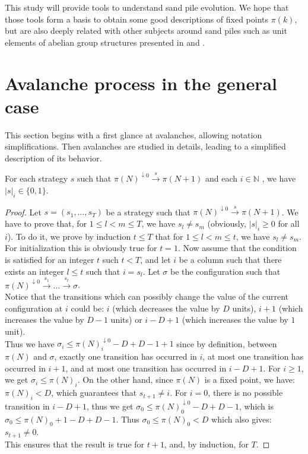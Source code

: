 \documentclass[11pt,a4paper]{llncs}
\newcommand{\N}{\mathbb{N}}
\begin{document}
This study will provide tools to understand sand pile evolution. We hope that those tools form a basis to obtain  some good descriptions of fixed points $\pi(k)$, but are also deeply related with other subjects around sand piles such as unit elements of abelian group structures presented 
in \cite{creutz96} and \cite{dhar90}.

\section{Avalanche process in the general case}\label{section:avalanche}

This section begins with a first glance at avalanches, allowing notation simplifications. Then avalanches are studied in details, leading to a simplified description of its behavior.

\begin{proposition}\label{lemma:01}
  For each strategy $s$  such that  $\pi(N)^{\downarrow 0}  \overset{s} {\rightarrow}\pi(N+1)$ and  each $i \in \N$ , we have  $|s|_i \in \{0,1\}$. 
\end{proposition}

\begin{proof}
  Let $s=(s_1,\dots,s_T)$ be a strategy such that  $\pi(N)^{\downarrow 0}  \overset{s} {\rightarrow}\pi(N+1)$. We have to  prove  that, for  
  $1 \leq l < m \leq T$, we have $s_l \not = s_m$ (obviously, $|s|_i \geq 0$ for all $i$). To do it,  we prove by induction $t \leq T$ that for
$1 \leq l < m \leq t$, we have $s_l \not = s_m$.\\ 
  For initialization this is obviously true for $t = 1$. 
   Now assume that the condition is satisfied for an integer $t$ such $t < T$, and let $i$ be a column such that there exists an integer $l \leq t$ such that $i = s_l$. Let $\sigma$  be the  configuration such that $\pi(N)^{\downarrow 0} \overset{s_1}{\rightarrow} \dots \overset{s_t}{\rightarrow} \sigma$.\\
  Notice that the transitions which can possibly change the value of the current configuration at $i$ could be: $i$ (which decreases the value by $D$ units), $i+1$ (which increases the value by $D -1$ units) or  $i - D+1$ (which increases the value by $1$ unit).\\
  Thus we have $\sigma_i \leq  \pi(N)^{\downarrow 0}_i - D + D-1 +1$ since by definition,  between   $\pi(N)$ and $\sigma$, exactly one transition has occurred in   $i$, at most one transition has occurred in $i+1$, and at most one transition has occurred in $i - D+1$. For $i \geq 1$, we get $\sigma_i \leq  \pi(N)_i $. On the other hand, since $\pi(N)$ is a fixed point, we have:   $\pi(N)_i < D $,  which guarantees that $s_{t+1} \neq i$. For $i = 0 $, there is no possible transition in $i - D+1$, thus we get $\sigma_0 \leq  \pi(N)^{\downarrow 0}_0 - D + D-1 $, which is  $\sigma_0 \leq  \pi(N)_0 +1 - D + D-1$. Thus    $\sigma_0 \leq  \pi(N)_0 < D $ which also gives: $s_{t+1}  \neq 0$.\\
  This ensures that the result is true for $t+1$,  and,  by induction,  for $T$. 
\end{proof}
\end{document}
